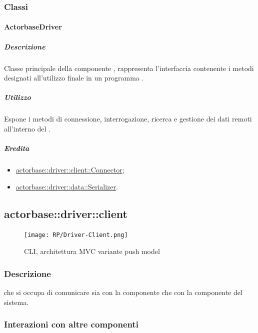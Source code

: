 \documentclass{scalatekids-article}
\begin{document}
\subsubsection{Classi}

\paragraph{ActorbaseDriver}
\label{sec:actorbase::driver::ActorbaseDriver}

\subparagraph{Descrizione}

Classe principale della componente , rappresenta l'interfaccia
contenente i metodi designati all'utilizzo finale in un programma .

\subparagraph{Utilizzo}

Espone i metodi di connessione, interrogazione, ricerca e gestione dei dati
remoti all'interno del .

\subparagraph{Eredita}

\begin{itemize}
\item \hyperref[sec:actorbase::driver::client::Connector]{actorbase::driver::client::Connector};
\item \hyperref[sec:actorbase::driver::client::Connector]{actorbase::driver::data::Serializer}.
\end{itemize}

\subsection{actorbase::driver::client}
\label{sec:actorbase::driver::client}

\begin{figure}[H]
  \begin{center}
    \texttt{[image: RP/Driver-Client.png]}
    \caption{CLI, architettura MVC variante push model}
  \end{center}
\end{figure}

\subsubsection{Descrizione}

 che si occupa di comunicare sia con la componente 
che con la componente  del sistema.

\subsubsection{Interazioni con altre componenti}
\end{document}
